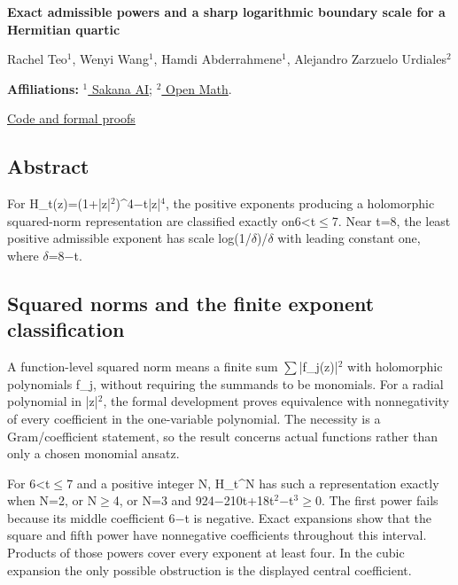\documentclass[11pt,a4paper]{article}
\begin{document}
{\LARGE\bfseries Exact admissible powers and a sharp logarithmic boundary scale for a Hermitian quartic\par}\medskip
{\small Rachel Teo\ensuremath{^1}, Wenyi Wang\ensuremath{^1}, Hamdi Abderrahmene\ensuremath{^1}, Alejandro Zarzuelo Urdiales\ensuremath{^2}\par}\medskip
{\small\textbf{Affiliations:} \href{https://sakana.ai/}{\ensuremath{^1} Sakana AI}; \href{https://rsihouse.ai/openmath}{\ensuremath{^2} Open Math}.\par}

{\small\href{https://github.com/alejandrozu/openmath-2026-judging}{Code and formal proofs}\par}

\subsection{Abstract}
For H\_t(z)=(1+|z|\ensuremath{^2})\textasciicircum{}4\ensuremath{-}t|z|\ensuremath{^4}, the positive exponents producing a holomorphic squared-norm representation are classified exactly on6<t\ensuremath{\leq}7. Near t=8, the least positive admissible exponent has scale log(1/\ensuremath{\delta})/\ensuremath{\delta} with leading constant one, where \ensuremath{\delta}=8\ensuremath{-}t.

\subsection{Squared norms and the finite exponent classification}
A function-level squared norm means a finite sum \ensuremath{\sum}|f\_j(z)|\ensuremath{^2} with holomorphic polynomials f\_j, without requiring the summands to be monomials. For a radial polynomial in |z|\ensuremath{^2}, the formal development proves equivalence with nonnegativity of every coefficient in the one-variable polynomial. The necessity is a Gram/coefficient statement, so the result concerns actual functions rather than only a chosen monomial ansatz.

For 6<t\ensuremath{\leq}7 and a positive integer N, H\_t\textasciicircum{}N has such a representation exactly when N=2, or N\ensuremath{\geq}4, or N=3 and 924\ensuremath{-}210t+18t\ensuremath{^2}\ensuremath{-}t\ensuremath{^3}\ensuremath{\geq}0. The first power fails because its middle coefficient 6\ensuremath{-}t is negative. Exact expansions show that the square and fifth power have nonnegative coefficients throughout this interval. Products of those powers cover every exponent at least four. In the cubic expansion the only possible obstruction is the displayed central coefficient.
\end{document}

